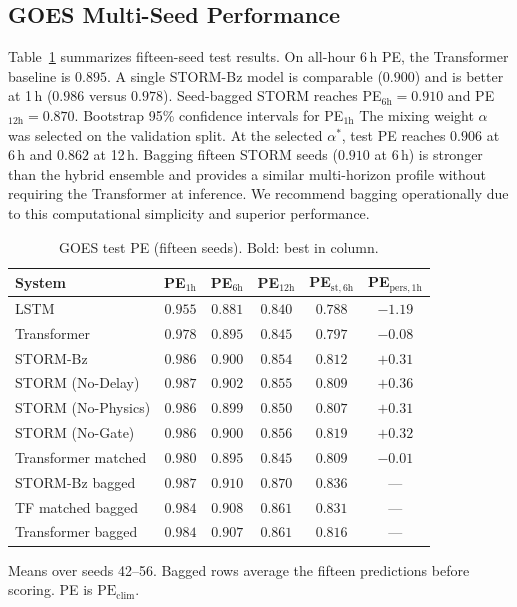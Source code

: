 \documentclass[conference]{IEEEtran}
\begin{document}
\subsection{GOES Multi-Seed Performance}
Table~\ref{tab:main} summarizes fifteen-seed test results. On all-hour 6\,h PE, the Transformer baseline is $0.895$.
A single STORM-Bz model is comparable ($0.900$) and is better at 1\,h
($0.986$ versus $0.978$).
Seed-bagged STORM reaches PE$_{6\mathrm{h}}=0.910$ and PE$_{12\mathrm{h}}=0.870$.
Bootstrap 95\% confidence intervals for PE$_{1\mathrm{h}}$
The mixing weight \(\alpha\) was selected on the validation split. 
At the selected \(\alpha^*\), test PE reaches \(0.906\) at 6\,h and \(0.862\) at 12\,h.
Bagging fifteen STORM seeds (\(0.910\) at 6\,h) is stronger than the hybrid ensemble and provides a similar multi-horizon profile without requiring the Transformer at inference. We recommend bagging operationally due to this computational simplicity and superior performance.

\begin{table}[!htbp]
\centering
\caption{GOES test PE (fifteen seeds). Bold: best in column.}
\label{tab:main}
\setlength{\tabcolsep}{3.2pt}
\begin{tabular}{lccccc}
\toprule
System & PE\(_{1\mathrm{h}}\) & PE\(_{6\mathrm{h}}\) & PE\(_{12\mathrm{h}}\) & PE\(_{\mathrm{st},6\mathrm{h}}\) & PE\(_{\mathrm{pers},1\mathrm{h}}\) \\
\midrule
LSTM                         & \(0.955\) & \(0.881\) & \(0.840\) & \(0.788\) & \(-1.19\) \\
Transformer                  & \(0.978\) & \(0.895\) & \(0.845\) & \(0.797\) & \(-0.08\) \\
STORM-Bz                     & \(\mathbf{0.986}\) & \(0.900\) & \(0.854\) & \(0.812\) & \(\mathbf{+0.31}\) \\
STORM (No-Delay)             & \(0.987\) & \(0.902\) & \(0.855\) & \(0.809\) & \(+0.36\) \\
STORM (No-Physics)           & \(0.986\) & \(0.899\) & \(0.850\) & \(0.807\) & \(+0.31\) \\
STORM (No-Gate)              & \(0.986\) & \(0.900\) & \(0.856\) & \(0.819\) & \(+0.32\) \\
Transformer matched          & \(0.980\) & \(0.895\) & \(0.845\) & \(0.809\) & \(-0.01\) \\
\midrule
STORM-Bz bagged              & \(\mathbf{0.987}\) & \(\mathbf{0.910}\) & \(\mathbf{0.870}\) & \(0.836\) & --- \\
TF matched bagged            & \(0.984\) & \(0.908\) & \(0.861\) & \(0.831\) & --- \\
Transformer bagged           & \(0.984\) & \(0.907\) & \(0.861\) & \(0.816\) & --- \\
\bottomrule
\end{tabular}

\vspace{1ex}
{\footnotesize \raggedright Means over seeds 42--56.
Bagged rows average the fifteen predictions before scoring. PE is \(\mathrm{PE}_{\mathrm{clim}}\).\par}
\end{table}
\end{document}

